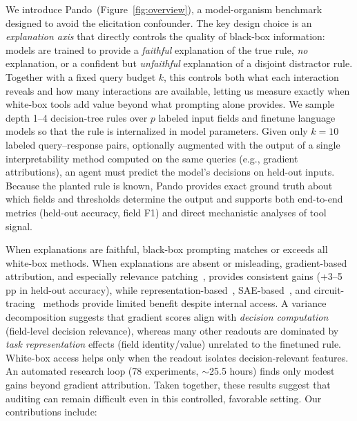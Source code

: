 \documentclass{article} %
\newcommand{\bench}{Pando}
\begin{document}
We introduce \bench{}~(Figure~\ref{fig:overview}), a model-organism benchmark~\citep{hubinger2023model_organism} designed to avoid the elicitation confounder.
The key design choice is an \emph{explanation axis} that directly controls the quality of black-box information: models are trained to provide a \emph{faithful} explanation of the true rule, \emph{no} explanation, or a confident but \emph{unfaithful} explanation of a disjoint distractor rule.
Together with a fixed query budget $k$, this controls both what each interaction reveals and how many interactions are available, letting us measure exactly when white-box tools add value beyond what prompting alone provides.
We sample depth 1--4 decision-tree rules over $p$ labeled input fields and finetune language models so that the rule is internalized in model parameters.
Given only $k{=}10$ labeled query--response pairs, optionally augmented with the output of a single interpretability method computed on the same queries (e.g., gradient attributions), an agent must predict the model's decisions on held-out inputs.
Because the planted rule is known, \bench{} provides exact ground truth about which fields and thresholds determine the output and supports both end-to-end metrics (held-out accuracy, field F1) and direct mechanistic analyses of tool signal.

When explanations are faithful, black-box prompting matches or exceeds all white-box methods.
When explanations are absent or misleading, gradient-based attribution, and especially relevance patching~\citep{relp2025}, provides consistent gains ({+3--5\,pp} in held-out accuracy), while representation-based~\citep{nostalgebraist2020logitlens}, SAE-based~\citep{cunningham2023sparse}, and circuit-tracing~\citep{ameisen2025circuit} methods provide limited benefit despite internal access.
A variance decomposition suggests that gradient scores align with \emph{decision computation} (field-level decision relevance), whereas many other readouts are dominated by \emph{task representation} effects (field identity/value) unrelated to the finetuned rule. White-box access helps only when the readout isolates decision-relevant features. An automated research loop (78 experiments, ${\sim}$25.5 hours) finds only modest gains beyond gradient attribution. Taken together, these results suggest that auditing can remain difficult even in this controlled, favorable setting. Our contributions include:
\end{document}
